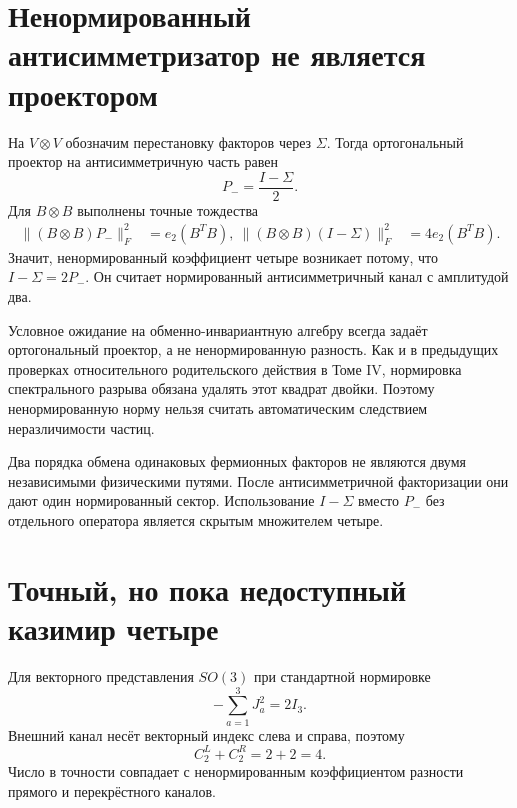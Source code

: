 \section{Ненормированный антисимметризатор не является проектором}

На $V\otimes V$ обозначим перестановку факторов через $\Sigma$. Тогда
ортогональный проектор на антисимметричную часть равен
\begin{equation}
 P_- =\frac{I-\Sigma}{2}.
\end{equation}
Для $B\otimes B$ выполнены точные тождества
\begin{align}
 \|(B\otimes B)P_-\|_F^2&=e_2(B^TB),\
 \|(B\otimes B)(I-\Sigma)\|_F^2&=4e_2(B^TB).
 \label{eq:v6-raw-versus-projected-exchange}
\end{align}
Значит, ненормированный коэффициент четыре возникает потому, что $I-\Sigma=2P_-$.
Он считает нормированный антисимметричный канал с амплитудой два.

Условное ожидание на обменно-инвариантную алгебру всегда задаёт
ортогональный проектор, а не ненормированную разность. Как и в предыдущих
проверках относительного родительского действия в Томе IV, нормировка
спектрального разрыва обязана удалять этот квадрат двойки. Поэтому
ненормированную норму нельзя считать
автоматическим следствием неразличимости частиц.

\begin{nogocriterion}
Два порядка обмена одинаковых фермионных факторов не являются двумя
независимыми физическими путями. После антисимметричной факторизации они дают
один нормированный сектор. Использование $I-\Sigma$ вместо $P_-$ без
отдельного оператора является скрытым множителем четыре.
\end{nogocriterion}

\section{Точный, но пока недоступный казимир четыре}

Для векторного представления $SO(3)$ при стандартной нормировке
\begin{equation}
 -\sum_{a=1}^3J_a^2=2I_3.
\end{equation}
Внешний канал несёт векторный индекс слева и справа, поэтому
\begin{equation}
 C_2^{L}+C_2^{R}=2+2=4.
 \label{eq:v6-left-right-so3-casimir-four}
\end{equation}
Число в точности совпадает с ненормированным коэффициентом разности
прямого и перекрёстного каналов.

